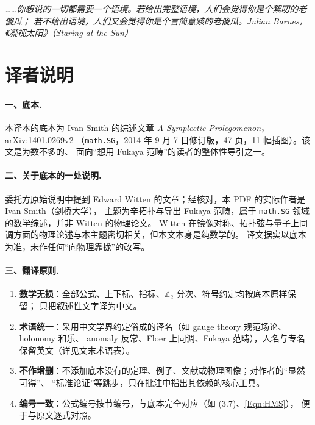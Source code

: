 \documentclass[11pt,a4paper]{article}
\numberwithin{equation}{section}
\newcommand{\bZ}{\mathbb{Z}}
\begin{document}
\thispagestyle{empty}
\vspace*{0.28\textheight}
\begin{epigraph}{\itshape
……你想说的一切都需要一个语境。若给出完整语境，人们会觉得你是个絮叨的老傻瓜；
若不给出语境，人们又会觉得你是个言简意赅的老傻瓜。}{\itshape Julian Barnes，《凝视太阳》（Staring at the Sun）}
\end{epigraph}

\clearpage

\section*{译者说明}

\paragraph{一、底本.}
本译本的底本为 Ivan Smith 的综述文章 \emph{A Symplectic Prolegomenon}，arXiv:1401.0269v2
（\texttt{math.SG}，2014 年 9 月 7 日修订版，47 页，11 幅插图）。该文是为数不多的、
面向“想用 Fukaya 范畴”的读者的整体性导引之一。

\paragraph{二、关于底本的一处说明.}
委托方原始说明中提到 Edward Witten 的文章；经核对，本 PDF 的实际作者是 Ivan Smith（剑桥大学），
主题为辛拓扑与导出 Fukaya 范畴，属于 \texttt{math.SG} 领域的数学综述，并非 Witten 的物理论文。
Witten 在镜像对称、拓扑弦与量子上同调方面的物理论述与本主题密切相关，但本文本身是纯数学的。
译文据实以底本为准，未作任何“向物理靠拢”的改写。

\paragraph{三、翻译原则.}
\begin{enumerate}
  \item \textbf{数学无损}：全部公式、上下标、指标、$\bZ_2$ 分次、符号约定均按底本原样保留；
        只把叙述性文字译为中文。
  \item \textbf{术语统一}：采用中文学界约定俗成的译名（如 gauge theory 规范场论、holonomy 和乐、
        anomaly 反常、Floer 上同调、Fukaya 范畴），人名与专名保留英文（详见文末术语表）。
  \item \textbf{不作增删}：不添加底本没有的定理、例子、文献或物理图像；对作者的“显然可得”、
        “标准论证”等跳步，只在批注中指出其依赖的核心工具。
  \item \textbf{编号一致}：公式编号按节编号，与底本完全对应（如 (3.7)、\eqref{Eqn:HMS}），
        便于与原文逐式对照。
\end{enumerate}
\end{document}
